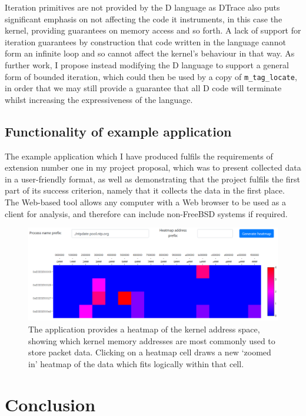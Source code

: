 \documentclass[a4paper,12pt,twoside,openright]{report}
\begin{document}
	Iteration primitives are not provided by the D language as DTrace also puts significant emphasis on not affecting the code it instruments, in this case the kernel, providing guarantees on memory access and so forth. A lack of support for iteration guarantees by construction that code written in the language cannot form an infinite loop and so cannot affect the kernel's behaviour in that way. As further work, I propose instead modifying the D language to support a general form of bounded iteration, which could then be used by a copy of \verb|m_tag_locate|, in order that we may still provide a guarantee that all D code will terminate whilst increasing the expressiveness of the language.
	
	\section{Functionality of example application}
	
	The example application which I have produced fulfils the requirements of extension number one in my project proposal, which was to present collected data in a user-friendly format, as well as demonstrating that the project fulfils the first part of its success criterion, namely that it collects the data in the first place. The Web-based tool allows any computer with a Web browser to be used as a client for analysis, and therefore can include non-FreeBSD systems if required.

	\begin{figure}
		\centering
		\includegraphics[width=\linewidth]{include/ui-address-heatmap.png}
		\caption{The application provides a heatmap of the kernel address space, showing which kernel memory addresses are most commonly used to store packet data. Clicking on a heatmap cell draws a new `zoomed in' heatmap of the data which fits logically within that cell.}
		\label{fig:ui-heatmap}
	\end{figure}
	
	\chapter{Conclusion}
	
\end{document}
